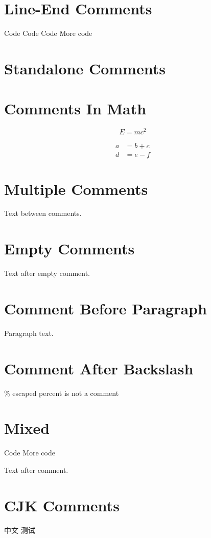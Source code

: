 \documentclass{article}
\begin{document}
\section{Line-End Comments}
Code %
Code %
Code %
More code%

\section{Standalone Comments}

\section{Comments In Math}
\begin{equation}
E = mc^2%
\end{equation}

\begin{align}
a &= b + c \\%
d &= e - f%
\end{align}

\section{Multiple Comments}
Text between comments.

\section{Empty Comments}
%
Text after empty comment.

\section{Comment Before Paragraph}
Paragraph text.


\section{Comment After Backslash}
\% escaped percent is not a comment

\section{Mixed}
Code %
More code %

Text after comment.

\section{CJK Comments}
中文 %
测试 %
\end{document}
